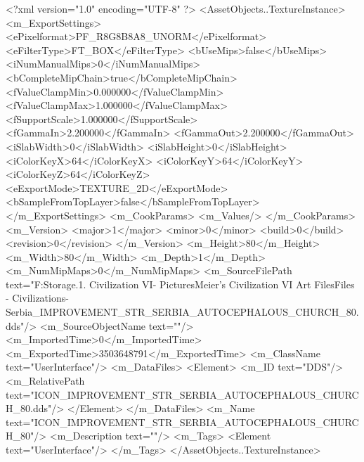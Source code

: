 <?xml version="1.0" encoding="UTF-8" ?>
<AssetObjects..TextureInstance>
	<m_ExportSettings>
		<ePixelformat>PF_R8G8B8A8_UNORM</ePixelformat>
		<eFilterType>FT_BOX</eFilterType>
		<bUseMips>false</bUseMips>
		<iNumManualMips>0</iNumManualMips>
		<bCompleteMipChain>true</bCompleteMipChain>
		<fValueClampMin>0.000000</fValueClampMin>
		<fValueClampMax>1.000000</fValueClampMax>
		<fSupportScale>1.000000</fSupportScale>
		<fGammaIn>2.200000</fGammaIn>
		<fGammaOut>2.200000</fGammaOut>
		<iSlabWidth>0</iSlabWidth>
		<iSlabHeight>0</iSlabHeight>
		<iColorKeyX>64</iColorKeyX>
		<iColorKeyY>64</iColorKeyY>
		<iColorKeyZ>64</iColorKeyZ>
		<eExportMode>TEXTURE_2D</eExportMode>
		<bSampleFromTopLayer>false</bSampleFromTopLayer>
	</m_ExportSettings>
	<m_CookParams>
		<m_Values/>
	</m_CookParams>
	<m_Version>
		<major>1</major>
		<minor>0</minor>
		<build>0</build>
		<revision>0</revision>
	</m_Version>
	<m_Height>80</m_Height>
	<m_Width>80</m_Width>
	<m_Depth>1</m_Depth>
	<m_NumMipMaps>0</m_NumMipMaps>
	<m_SourceFilePath text="F:\Mod Storage\2.1. Civilization VI\Mods\Archive - Pictures\Sid Meier's Civilization VI Art Files\Art Files - Civilizations\Civilization - Serbia\ICON_IMPROVEMENT_STR_SERBIA_AUTOCEPHALOUS_CHURCH_80.dds"/>
	<m_SourceObjectName text=""/>
	<m_ImportedTime>0</m_ImportedTime>
	<m_ExportedTime>3503648791</m_ExportedTime>
	<m_ClassName text="UserInterface"/>
	<m_DataFiles>
		<Element>
			<m_ID text="DDS"/>
			<m_RelativePath text="ICON_IMPROVEMENT_STR_SERBIA_AUTOCEPHALOUS_CHURCH_80.dds"/>
		</Element>
	</m_DataFiles>
	<m_Name text="ICON_IMPROVEMENT_STR_SERBIA_AUTOCEPHALOUS_CHURCH_80"/>
	<m_Description text=""/>
	<m_Tags>
		<Element text="UserInterface"/>
	</m_Tags>
</AssetObjects..TextureInstance>

